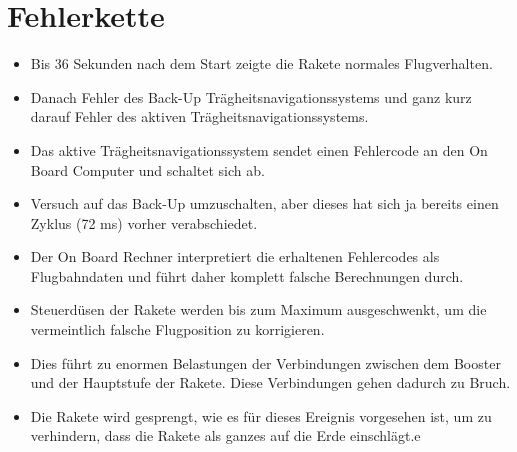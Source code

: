

\section{Fehlerkette}

\begin{itemize}
	\item Bis 36 Sekunden nach dem Start zeigte die Rakete normales Flugverhalten.
	\item Danach Fehler des Back-Up Trägheitsnavigationssystems und ganz kurz darauf Fehler des aktiven Trägheitsnavigationssystems.
	\item Das aktive Trägheitsnavigationssystem sendet einen Fehlercode an den On Board Computer und schaltet sich ab.
	\item Versuch auf das Back-Up umzuschalten, aber dieses hat sich ja bereits einen Zyklus (72 ms) vorher verabschiedet.
	\item Der On Board Rechner interpretiert die erhaltenen Fehlercodes als Flugbahndaten und führt daher komplett falsche Berechnungen durch.
	\item Steuerdüsen der Rakete werden bis zum Maximum ausgeschwenkt, um die vermeintlich falsche Flugposition zu korrigieren.
	\item Dies führt zu enormen Belastungen der Verbindungen zwischen dem Booster und der Hauptstufe der Rakete. Diese Verbindungen gehen dadurch zu Bruch.
	\item Die Rakete wird gesprengt, wie es für dieses Ereignis vorgesehen ist, um zu verhindern, dass die Rakete als ganzes auf die Erde einschlägt.e
\end{itemize}

